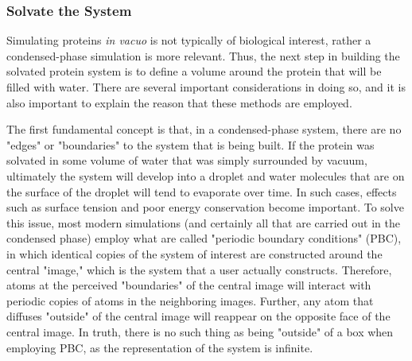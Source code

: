 \documentclass[9pt,tutorial]{livecoms}
\begin{document}
\subsubsection{Solvate the System} \label{lyso_solv}

Simulating proteins {\em in vacuo} is not typically of biological interest, rather a condensed-phase simulation is more relevant. Thus, the next step in building the solvated protein system is to define a volume around the protein that will be filled with water. There are several important considerations in doing so, and it is also important to explain the reason that these methods are employed.

The first fundamental concept is that, in a condensed-phase system, there are no "edges" or "boundaries" to the system that is being built. If the protein was solvated in some volume of water that was simply surrounded by vacuum, ultimately the system will develop into a droplet and water molecules that are on the surface of the droplet will tend to evaporate over time. In such cases, effects such as surface tension and poor energy conservation become important. To solve this issue, most modern simulations (and certainly all that are carried out in the condensed phase) employ what are called "periodic boundary conditions" (PBC), in which identical copies of the system of interest are constructed around the central "image," which is the system that a user actually constructs. Therefore, atoms at the perceived "boundaries" of the central image will interact with periodic copies of atoms in the neighboring images. Further, any atom that diffuses "outside" of the central image will reappear on the opposite face of the central image. In truth, there is no such thing as being "outside" of a box when employing PBC, as the representation of the system is infinite.
\end{document}
